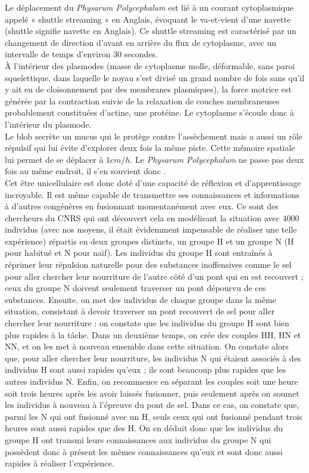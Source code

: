 \documentclass[]{report}
\theoremstyle{definition}
\begin{document}
{Le déplacement du \textit{Physarum Polycephalum} est lié à un courant cytoplasmique appelé « shuttle streaming » en Anglais, évoquant le va-et-vient d'une navette (shuttle signifie navette en Anglais). Ce shuttle streaming est caractérisé par un changement de direction d’avant en arrière du flux de cytoplasme, avec un intervalle de temps d'environ 30 secondes.}\\
{À l’intérieur des plasmodes (masse de cytoplasme molle, déformable, sans paroi squelettique, dans laquelle le noyau s'est divisé un grand nombre de fois sans qu'il y ait eu de cloisonnement par des membranes plasmiques), la force motrice est générée par la contraction suivie de la relaxation de couches membraneuses probablement constituées d’actine, une protéine. Le cytoplasme s’écoule donc à l’intérieur du plasmode.}\\
{Le blob secrète un mucus qui le protège contre l’assèchement  mais a aussi un rôle répulsif qui lui évite d'explorer deux fois la même piste. Cette mémoire spatiale lui permet de se déplacer à \(1 cm/h\). Le \textit{Physarum Polycephalum} ne passe pas deux fois au même endroit, il s’en souvient donc \cite{futura}.}\\
{Cet être unicellulaire est donc doté d’une capacité de réflexion et d'apprentissage incroyable. 
Il est même capable de transmettre ses connaissances et informations à d’autres congénères en fusionnant momentanément avec eux. 
Ce sont des chercheurs du CNRS qui ont découvert cela en modélisant la situation avec 4000 individus (avec nos moyens, il était évidemment impensable de réaliser une telle expérience) répartis en deux groupes distincts, un groupe H et un groupe N (H pour habitué et N pour naif).
Les individus du groupe H sont entraînés à réprimer leur répulsion naturelle pour des substances inoffensives comme le sel pour aller chercher leur nourriture de l'autre côté d'un pont qui en est recouvert ; ceux du groupe N doivent seulement traverser un pont dépourvu de ces substances. Ensuite, on met des individus de chaque groupe dans la même situation, consistant à devoir traverser un pont recouvert de sel pour aller chercher leur nourriture : on constate que les individus du groupe H sont bien plus rapides à la tâche.
Dans un deuxième temps, on crée des couples HH, HN et NN, et on les met à nouveau ensemble dans cette situation. On constate alors que, pour aller chercher leur nourriture, les individus N qui étaient associés à des individus H sont aussi rapides qu'eux ; ils sont beaucoup plus rapides que les autres individus N. Enfin, on recommence en séparant les couples soit une heure soit trois heures après les avoir laissés fusionner, puis seulement après on soumet les individus à nouveau à l'épreuve du pont de sel. Dans ce cas, on constate que, parmi les N qui ont fusionné avec un H, seuls ceux qui ont fusionné pendant trois heures sont aussi rapides que des H. On en déduit donc que les individus du groupe H ont transmi leurs connaissances aux individus du groupe N qui possèdent donc à présent les mêmes connaissances qu’eux et sont donc aussi rapides à réaliser l'expérience.}\\
\end{document}
